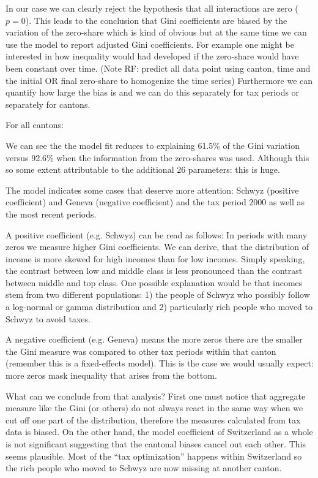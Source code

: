 \documentclass[twoside]{article}\usepackage[]{graphicx}\usepackage[]{color}
\begin{document}
\begin{multicols}{2}
In our case we can clearly reject the hypothesis that all interactions are zero ($p=0$). This leads to the conclusion  that Gini coefficients are biased by the variation of the zero-share which is kind of obvious but at the same time we can use the model to report adjusted Gini coefficients. For example one might be interested in how inequality would had developed if the zero-share would have been constant over time. (Note RF: predict all data point using canton, time and the initial OR final zero-share to homogenize the time series)
Furthermore we can quantify how large the bias is and we can do this separately for tax periods or separately for cantons. 

For all cantons:




We can see the the model fit reduces to explaining 61.5\% of the Gini variation versus 92.6\% when the information from the zero-shares was used. Although this so some extent attributable to the additional 26 parameters: this is huge. 

The model indicates some cases that deserve more attention: Schwyz (positive coefficient) and Geneva (negative coefficient) and the tax period 2000 as well as the most recent periods.

A positive coefficient (e.g. Schwyz) can be read as follows: In periods with many zeros we measure higher Gini coefficients. We can derive, that the distribution of income is more skewed for high incomes than for low incomes. Simply speaking, the contrast between low and middle class is less pronounced than the contrast between middle and top class. One possible explanation would be that incomes stem from two different populations: 1) the people of Schwyz who possibly follow a log-normal or gamma distribution and 2) particularly rich people who moved to Schwyz to avoid taxes. 

A negative coefficient (e.g. Geneva) means the more zeros there are the smaller the Gini measure was compared to other tax periods within that canton (remember this is a fixed-effects model). This is the case we would usually expect: more zeros mask inequality that arises from the bottom.

What can we conclude from that analysis? First one must notice that aggregate measure like the Gini (or others) do not always react in the same way when we cut off one part of the distribution, therefore the measures calculated from tax data is biased. On the other hand, the model coefficient of Switzerland as a whole is not significant suggesting that the cantonal biases cancel out each other. This seems plausible. Most of the ``tax optimization'' happens within Switzerland so the rich people who moved to Schwyz are now missing at another canton.


\end{multicols}
\end{document}
